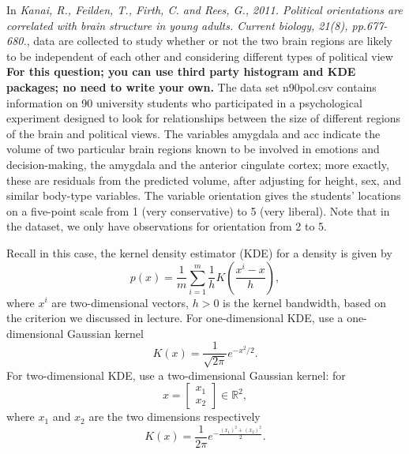 \documentclass[twoside,12pt]{article}
\begin{document}
In {\it Kanai, R., Feilden, T., Firth, C. and Rees, G., 2011. Political orientations are correlated with brain structure in young adults. Current biology, 21(8), pp.677-680.}, data are collected to  study whether or not the two brain regions are likely to be independent of each other and considering different types of political view \textbf{For this question; you can use third party histogram and KDE packages; no need to write your own.} The data set \textsf{n90pol.csv} contains information on 90 university students who participated in a psychological experiment designed to look for relationships between the size of different regions of the brain and political views. The variables \textsf{amygdala} and \textsf{acc} indicate the volume of two particular brain regions known to be involved in emotions and decision-making, the amygdala and the anterior cingulate cortex; more exactly, these are residuals from the predicted volume, after adjusting for height, sex, and similar body-type variables. The variable \textsf{orientation} gives the students' locations on a five-point scale from 1 (very conservative) to 5 (very liberal).  Note that in the dataset, we only have observations for orientation from 2 to 5. 

Recall in this case, the kernel density estimator (KDE) for a density is given by
 \[
 p(x) = \frac 1 m \sum_{i=1}^m \frac 1 h
 K\left(
 \frac{x^i - x}{h}
 \right),
 \]
where $x^i$ are two-dimensional vectors, $h >0$ is the kernel bandwidth, based on the criterion we discussed in lecture. 
For one-dimensional KDE,  use a one-dimensional Gaussian kernel
\[
K(x) = \frac{1}{\sqrt{2\pi}} e^{-x^2/2}.
\]
For two-dimensional KDE, use a two-dimensional Gaussian kernel: for \[x = \begin{bmatrix}x_1\\x_2\end{bmatrix}\in \mathbb R^2,\] where $x_1$ and $x_2$ are the two dimensions respectively \[K(x) = \frac{1}{2\pi} e^{-\frac{(x_1)^2 + (x_2)^2}{2}}.\] 
  
\end{document}
